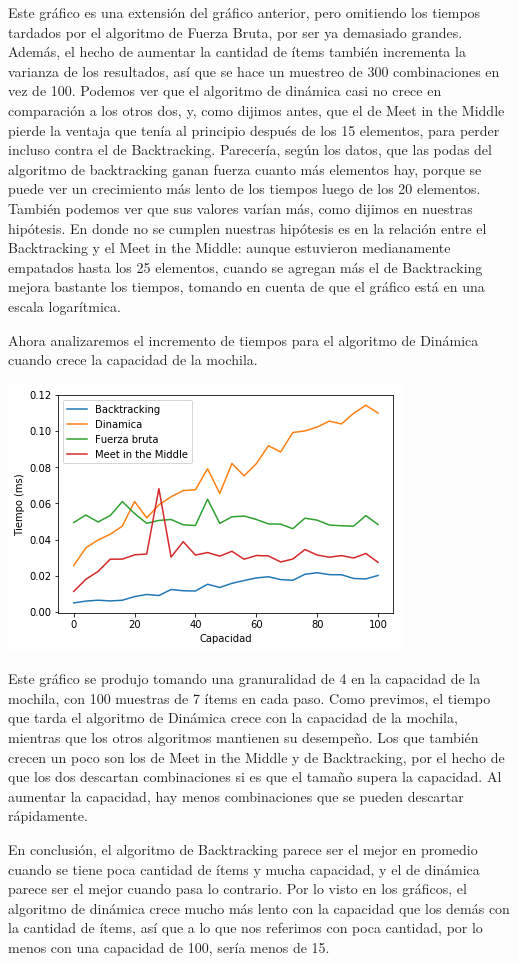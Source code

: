 \documentclass[10pt, a4paper]{article}
\begin{document}
Este gráfico es una extensión del gráfico anterior, pero omitiendo los tiempos tardados por el algoritmo de Fuerza Bruta, por ser ya demasiado grandes. Además, el hecho de aumentar la cantidad de ítems también incrementa la varianza de los resultados, así que se hace un muestreo de 300 combinaciones en vez de 100. Podemos ver que el algoritmo de dinámica casi no crece en comparación a los otros dos, y, como dijimos antes, que el de Meet in the Middle pierde la ventaja que tenía al principio después de los 15 elementos, para perder incluso contra el de Backtracking. Parecería, según los datos, que las podas del algoritmo de backtracking ganan fuerza cuanto más elementos hay, porque se puede ver un crecimiento más lento de los tiempos luego de los 20 elementos. También podemos ver que sus valores varían más, como dijimos en nuestras hipótesis. En donde no se cumplen nuestras hipótesis es en la relación entre el Backtracking y el Meet in the Middle: aunque estuvieron medianamente empatados hasta los 25 elementos, cuando se agregan más el de Backtracking mejora bastante los tiempos, tomando en cuenta de que el gráfico está en una escala logarítmica.\par
Ahora analizaremos el incremento de tiempos para el algoritmo de Dinámica cuando crece la capacidad de la mochila.\par
\includegraphics{aumentocapacidad.png}

Este gráfico se produjo tomando una granuralidad de 4 en la capacidad de la mochila, con 100 muestras de 7 ítems en cada paso. Como previmos, el tiempo que tarda el algoritmo de Dinámica crece con la capacidad de la mochila, mientras que los otros algoritmos mantienen su desempeño. Los que también crecen un poco son los de Meet in the Middle y de Backtracking, por el hecho de que los dos descartan combinaciones si es que el tamaño supera la capacidad. Al aumentar la capacidad, hay menos combinaciones que se pueden descartar rápidamente.\par
En conclusión, el algoritmo de Backtracking parece ser el mejor en promedio cuando se tiene poca cantidad de ítems y mucha capacidad, y el de dinámica parece ser el mejor cuando pasa lo contrario. Por lo visto en los gráficos, el algoritmo de dinámica crece mucho más lento con la capacidad que los demás con la cantidad de ítems, así que a lo que nos referimos con poca cantidad, por lo menos con una capacidad de 100, sería menos de 15.
\end{document}
